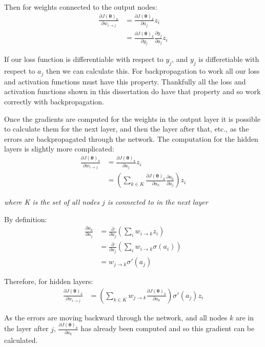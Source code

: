 \documentclass[12pt,a4paper,twoside,openright]{report}
\renewcommand{\vec}[1]{\bm{#1}}
\begin{document}
Then for weights connected to the output nodes:
\begin{align}
  \frac{\partial J(\vec{\theta})_k}{\partial w_{i \to j}} & = \frac{\partial J(\vec{\theta})_k}{\partial a_j} z_i \\
  & = \frac{\partial J(\vec{\theta})_k}{\partial y_j} \frac{\partial y_j}{\partial a_j} z_i
\end{align}

If our loss function is differentiable with respect to $y_j$, and $y_j$ is differetiable with respect to $a_j$ then we can calculate this.  
For backpropagation to work all our loss and activation functions must have this property. Thankfully all the loss and activation functions 
shown in this dissertation do have that property and so work correctly with backpropagation.

Once the gradients are computed for the weights in the output layer it is possible to calculate them for the next layer, and then the
layer after that, etc., as the errors are backpropagated through the network. The computation for the hidden layers is slightly more 
complicated:
\begin{align}
  \frac{\partial J(\vec{\theta})_k}{\partial w_{i \to j}} & = \frac{\partial J(\vec{\theta})_k}{\partial a_j} z_i \\
  & = \left( \sum_{k \in K} \frac{\partial J(\vec{\theta})_k}{\partial a_k} \frac{\partial a_k}{\partial a_j} \right) z_i
\end{align}
\begin{center}
  \textit{where K is the set of all nodes $j$ is connected to in the next layer}
\end{center}

By definition:
\begin{align}
  \frac{\partial a_k}{\partial a_j} & = \frac{\partial}{\partial a_j} \left( \sum_{i} w_{i \to k} z_i \right) \\
  & = \frac{\partial}{\partial a_j} \left( \sum_{i} w_{i \to k} \sigma(a_i) \right) \\
  & = w_{j \to k} \sigma'(a_j)
\end{align}

Therefore, for hidden layers:
\begin{align}
  \frac{\partial J(\vec{\theta})_k}{\partial w_{i \to j}} & = \left( \sum_{k \in K} w_{j \to k} \frac{\partial J(\vec{\theta})_k}{\partial a_k} \right) \sigma'(a_j) z_i
\end{align}

As the errors are moving backward through the network, and all nodes $k$ are in the layer after $j$, $\frac{\partial J(\vec{\theta})_k}{\partial a_k}$
has already been computed and so this gradient can be calculated.
\end{document}
